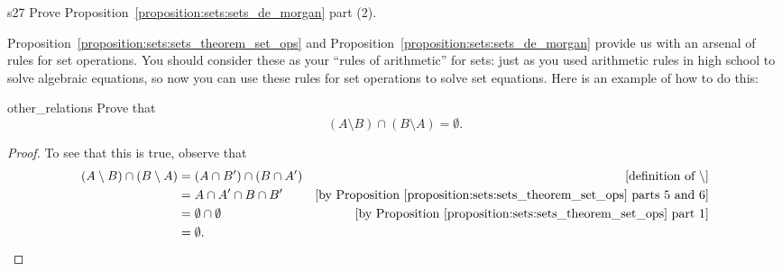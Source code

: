 \begin{exercise}{s27}
Prove Proposition~\ref{proposition:sets:sets_de_morgan} part (2).
\end{exercise}
 
\medskip{}
\noindent
Proposition~\ref{proposition:sets:sets_theorem_set_ops} and Proposition~\ref{proposition:sets:sets_de_morgan} provide us with an arsenal of rules for set operations. You should consider these as your ``rules of arithmetic'' for sets: just as you used arithmetic rules in high school to solve algebraic equations, so now you can use these rules for set operations to solve set equations.  Here is an example of how to do this:

\begin{example}{other_relations}
Prove that
\[
( A \setminus B) \cap (B \setminus A) = \emptyset.
\]

\begin{proof}
To see that this is true, observe that
\begin{align*}
( A \setminus B) \cap (B \setminus A)
& =
( A \cap B') \cap (B \cap A')   & \mbox{[definition of } \setminus] \\
& =
A \cap A' \cap B \cap B'    &\mbox{[by Proposition~\ref{proposition:sets:sets_theorem_set_ops} parts 5 and 6]} \\
&= \emptyset \cap \emptyset    &\mbox{[by Proposition~\ref{proposition:sets:sets_theorem_set_ops} part 1]} \\
& = \emptyset. \\
\end{align*}
\end{proof}
\end{example}







 
